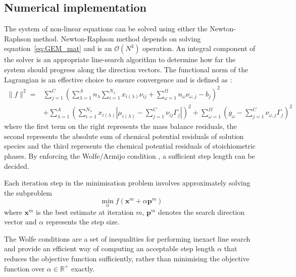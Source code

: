 	\subsection{Numerical implementation}
	The system of non-linear equations can be solved using either the Newton-Raphson method. Newton-Raphson method depends on solving  equation~\eqref{eq:GEM_mat} and is an $\mathcal{O}(N^3)$ operation.
	An integral component of the solver is an appropriate line-search algorithm to determine how far the system should progress along the direction vectors. The functional norm of the Lagrangian is an effective choice to ensure convergence and is defined as \cite{Piro17}:
	\begin{equation}
	\begin{aligned}
		\|f\|^2 = &\sum_{j=1}^{C}\left(\sum_{\lambda=1}^{\Lambda} n_\lambda \sum_{i=1}^{N_\lambda} x_{i(\lambda)}\nu_{ij} + \sum_{\omega=1}^{\Omega}n_{\omega}\nu_{\omega,j} - b_j\right)^2 \\
		&+ \sum_{\lambda=1}^{\Lambda} \left(\sum_{i=1}^{N_\lambda} x_{i(\lambda)}\left\vert\mu_{i(\lambda)} - \sum_{j=1}^{C}\nu_{ij} \Gamma_j \right\vert \right)^2 + \sum_{\omega=1}^{\Omega}\left(g_\omega - \sum_{j=1}^{C}\nu_{\omega,j} \Gamma_j \right)^2
		\end{aligned}
	\end{equation}
	where the first term on the right represents the mass balance residuals, the second represents the absolute sum of chemical potential residuals of solution species and the third represents the chemical potential residuals of stoichiometric phases. By enforcing the Wolfe/Armijo condition \cite{Nocedal06}, a sufficient step length can be decided.

	Each iteration step in the minimisation problem involves approximately solving the subproblem
	\begin{equation}
		\min_\alpha f\left(\mathbf{x}^m + \alpha \mathbf{p}^m\right)
	\end{equation}
	where $\mathbf{x}^m$ is the best estimate at iteration $m$, $\mathbf{p}^m$ denotes the search direction vector and $\alpha$ represents the step size.

	The Wolfe conditions are a set of inequalities for performing inexact line search and provide an efficient way of computing an acceptable step length $\alpha$  that reduces the objective function sufficiently, rather than minimising the objective function over $\alpha \in \mathbb {R}^{+}$ exactly.

